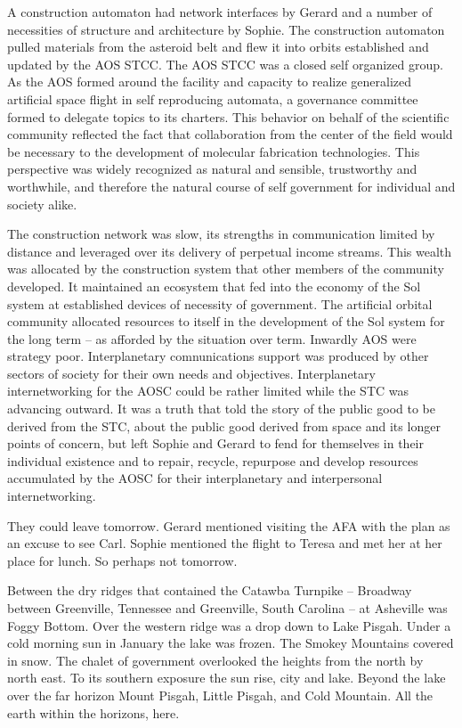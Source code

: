 A construction automaton had network interfaces by Gerard and a number
of necessities of structure and architecture by Sophie.  The
construction automaton pulled materials from the asteroid belt and
flew it into orbits established and updated by the AOS STCC.  The AOS
STCC was a closed self organized group.  As the AOS formed around the
facility and capacity to realize generalized artificial space flight
in self reproducing automata, a governance committee formed to
delegate topics to its charters.  This behavior on behalf of the
scientific community reflected the fact that collaboration from the
center of the field would be necessary to the development of molecular
fabrication technologies.  This perspective was widely recognized as
natural and sensible, trustworthy and worthwhile, and therefore the
natural course of self government for individual and society alike.

The construction network was slow, its strengths in communication
limited by distance and leveraged over its delivery of perpetual
income streams.  This wealth was allocated by the construction system
that other members of the community developed.  It maintained an
ecosystem that fed into the economy of the Sol system at established
devices of necessity of government.  The artificial orbital community
allocated resources to itself in the development of the Sol system for
the long term -- as afforded by the situation over term.  Inwardly AOS
were strategy poor.  Interplanetary comnunications support was
produced by other sectors of society for their own needs and
objectives.  Interplanetary internetworking for the AOSC could be
rather limited while the STC was advancing outward.  It was a truth
that told the story of the public good to be derived from the STC,
about the public good derived from space and its longer points of
concern, but left Sophie and Gerard to fend for themselves in their
individual existence and to repair, recycle, repurpose and develop
resources accumulated by the AOSC for their interplanetary and
interpersonal internetworking.



They could leave tomorrow.  Gerard mentioned visiting the AFA with the
plan as an excuse to see Carl.  Sophie mentioned the flight to Teresa
and met her at her place for lunch.  So perhaps not tomorrow.



Between the dry ridges that contained the Catawba Turnpike -- Broadway
between Greenville, Tennessee and Greenville, South Carolina -- at
Asheville was Foggy Bottom.  Over the western ridge was a drop down to
Lake Pisgah.  Under a cold morning sun in January the lake was frozen.
The Smokey Mountains covered in snow.  The chalet of government
overlooked the heights from the north by north east.  To its southern
exposure the sun rise, city and lake.  Beyond the lake over the far
horizon Mount Pisgah, Little Pisgah, and Cold Mountain.  All the earth
within the horizons, here.



